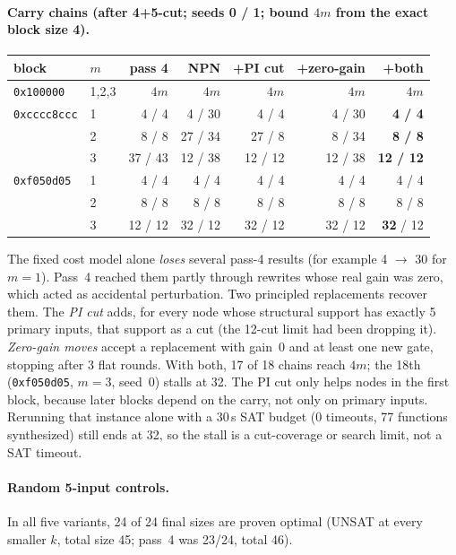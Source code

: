 \documentclass[11pt]{article}
\begin{document}
\paragraph{Carry chains (after 4+5-cut; seeds 0 / 1; bound $4m$ from the exact block size 4).}
\begin{center}\small\begin{tabular}{llrrrrr}\toprule
block & $m$ & pass 4 & NPN & +PI cut & +zero-gain & +both\\\midrule
\texttt{0x100000} & 1,2,3 & $4m$ & $4m$ & $4m$ & $4m$ & $4m$\\
\texttt{0xcccc8ccc} & 1 & 4 / 4 & 4 / 30 & 4 / 4 & 4 / 30 & \textbf{4 / 4}\\
 & 2 & 8 / 8 & 27 / 34 & 27 / 8 & 8 / 34 & \textbf{8 / 8}\\
 & 3 & 37 / 43 & 12 / 38 & 12 / 12 & 12 / 38 & \textbf{12 / 12}\\
\texttt{0xf050d05} & 1 & 4 / 4 & 4 / 4 & 4 / 4 & 4 / 4 & 4 / 4\\
 & 2 & 8 / 8 & 8 / 8 & 8 / 8 & 8 / 8 & 8 / 8\\
 & 3 & 12 / 12 & 32 / 12 & 32 / 12 & 32 / 12 & \textbf{32} / 12\\\bottomrule
\end{tabular}\end{center}
The fixed cost model alone \emph{loses} several pass-4 results (for example 4 $\to$ 30 for $m=1$). Pass~4 reached them partly through rewrites whose real gain was zero, which acted as accidental perturbation. Two principled replacements recover them. The \emph{PI cut} adds, for every node whose structural support has exactly 5 primary inputs, that support as a cut (the 12-cut limit had been dropping it). \emph{Zero-gain moves} accept a replacement with gain~0 and at least one new gate, stopping after 3 flat rounds. With both, 17 of 18 chains reach $4m$; the 18th (\texttt{0xf050d05}, $m=3$, seed~0) stalls at 32. The PI cut only helps nodes in the first block, because later blocks depend on the carry, not only on primary inputs. Rerunning that instance alone with a 30\,s SAT budget (0 timeouts, 77 functions synthesized) still ends at 32, so the stall is a cut-coverage or search limit, not a SAT timeout.

\paragraph{Random 5-input controls.} In all five variants, 24 of 24 final sizes are proven optimal (UNSAT at every smaller $k$, total size 45; pass~4 was 23/24, total 46).
\end{document}
